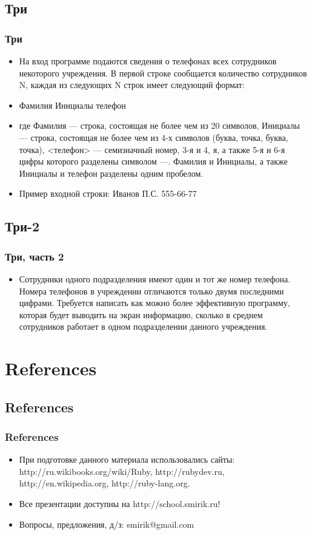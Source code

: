 \documentclass[compress,red]{beamer}
\begin{document}
\subsection{Три}
\begin{frame}[fragile]
  \frametitle{Три}
  \begin{itemize}
    \item На вход программе подаются сведения о телефонах всех сотрудников некоторого учреждения. В первой строке сообщается количество сотрудников N, каждая из следующих N строк имеет следующий формат: 
    \item Фамилия Инициалы телефон
    \item где Фамилия --- строка, состоящая не более чем из 20 символов, Инициалы --- строка, состоящая не более чем из 4-х символов (буква, точка, буква, точка), <телефон> --- семизначный номер, 3-я и 4, я, а также 5-я и 6-я цифры которого разделены символом ---. Фамилия и Инициалы, а также Инициалы и телефон разделены одним пробелом.
    \item Пример входной строки: Иванов П.С. 555-66-77
  \end{itemize}
\end{frame}

\subsection{Три-2}
\begin{frame}[fragile]
  \frametitle{Три, часть 2}
  \begin{itemize}
    \item Сотрудники одного подразделения имеют один и тот же номер телефона. Номера телефонов в учреждении отличаются только двумя последними цифрами. Требуется написать как можно более эффективную программу, которая будет выводить на экран информацию, сколько в среднем сотрудников работает в одном подразделении данного учреждения.
  \end{itemize}
\end{frame}
\section{References}
\subsection{References}
\begin{frame}[fragile]
  \frametitle{References}
  \begin{itemize}
    \item При подготовке данного материала использовались сайты: http://ru.wikibooks.org/wiki/Ruby, http://rubydev.ru, http://en.wikipedia.org, http://ruby-lang.org.
    \item Все презентации доступны на http://school.smirik.ru!
    \item Вопросы, предложения, д/з: smirik@gmail.com
  \end{itemize}
\end{frame}
\end{document}
